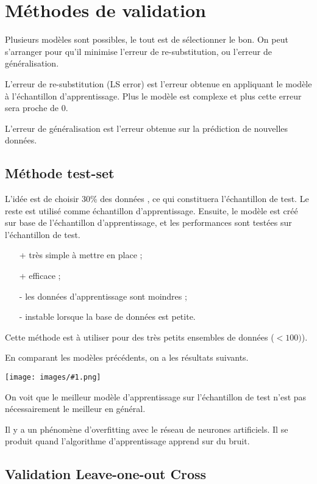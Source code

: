 \documentclass[10pt,a4paper]{report}
\newcommand{\dessin}[1]{\begin{center}\texttt{[image: images/\#1.png]}\end{center}}
\begin{document}
	\section{Méthodes de validation}
	
	Plusieurs modèles sont possibles, le tout est de sélectionner le bon. On peut s'arranger pour qu'il minimise l'erreur de re-substitution, ou l'erreur de généralisation.
	
	L'erreur de re-substitution (LS error) est l'erreur obtenue en appliquant le modèle à l'échantillon d'apprentissage. Plus le modèle est complexe et plus cette erreur sera proche de 0.
	
	L'erreur de généralisation est l'erreur obtenue sur la prédiction de nouvelles données.
	
		\subsection{Méthode test-set}
		
		L'idée est de choisir 30\% des données , ce qui constituera l'échantillon de test. Le reste est utilisé comme échantillon d'apprentissage. Ensuite, le modèle est créé sur base de l'échantillon d'apprentissage, et les performances sont testées sur l'échantillon de test.
		
		\begin{itemize}
			\item[+] très simple à mettre en place ;
			\item[+] efficace ;
			\item[-] les données d'apprentissage sont moindres ;
			\item[-] instable lorsque la base de données est petite.
		\end{itemize}
		
		Cette méthode est à utiliser pour des très petits ensembles de données ($< 100)$).
		
		En comparant les modèles précédents, on a les résultats suivants.
		
		\dessin{6}
		
		On voit que le meilleur modèle d'apprentissage sur l'échantillon de test n'est pas nécessairement le meilleur en général.
		
		Il y a un phénomène d'overfitting avec le réseau de neurones artificiels. Il se produit quand l'algorithme d'apprentissage apprend sur du bruit.
		
		\subsection{Validation Leave-one-out Cross}
		
\end{document}
